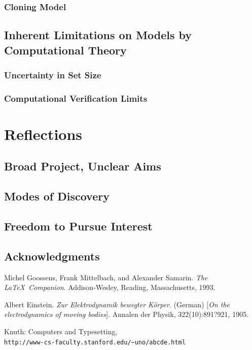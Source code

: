 \documentclass[11pt,a4paper]{report}
\begin{document}
\subsection{Cloning Model}

\section{Inherent Limitations on Models by Computational Theory}
\subsection{Uncertainty in Set Size}
\subsection{Computational Verification Limits}



\chapter{Reflections}
\section{Broad Project, Unclear Aims}
\section{Modes of Discovery}
\section{Freedom to Pursue Interest}
\section{Acknowledgments}





\begin{thebibliography}{9}
Michel Goossens, Frank Mittelbach, and Alexander Samarin. 
\textit{The \LaTeX\ Companion}. 
Addison-Wesley, Reading, Massachusetts, 1993.
 
Albert Einstein. 
\textit{Zur Elektrodynamik bewegter K{\"o}rper}. (German) 
[\textit{On the electrodynamics of moving bodies}]. 
Annalen der Physik, 322(10):891?921, 1905.
 
Knuth: Computers and Typesetting,
\\\texttt{http://www-cs-faculty.stanford.edu/\~{}uno/abcde.html}
\end{thebibliography}
 
\end{document}
